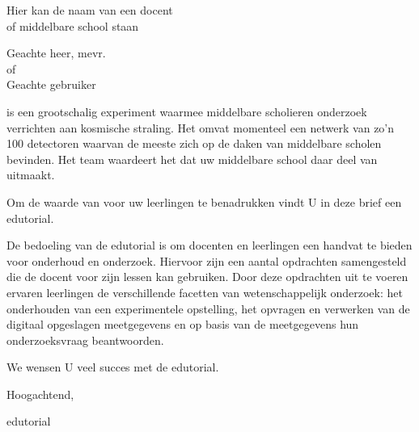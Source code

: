 




\date{}

\maketitle
 
Hier kan de naam van een docent \\ of middelbare school staan

Geachte heer, mevr.  \\of   \\Geachte \hisparc gebruiker

\hisparc is een grootschalig experiment waarmee middelbare scholieren
onderzoek verrichten aan kosmische straling. Het omvat momenteel een
netwerk van zo'n 100 detectoren waarvan de meeste zich op de daken van
middelbare scholen bevinden. Het \hisparc team waardeert het dat uw
middelbare school daar deel van uitmaakt.  

Om de waarde van \hisparc voor uw leerlingen te benadrukken vindt U in
deze brief een \hisparc edutorial.

De bedoeling van de edutorial is om docenten en leerlingen een handvat
te bieden voor onderhoud en onderzoek. Hiervoor zijn een aantal
opdrachten samengesteld die de docent voor zijn lessen kan gebruiken.
Door deze opdrachten uit te voeren ervaren leerlingen de verschillende
facetten van wetenschappelijk onderzoek: het onderhouden van een
experimentele opstelling, het opvragen en verwerken van de digitaal
opgeslagen meetgegevens en op basis van de meetgegevens hun
onderzoeksvraag beantwoorden. 

We wensen U veel succes met de \hisparc edutorial.
 
Hoogachtend,

\hisparc edutorial
 
 

